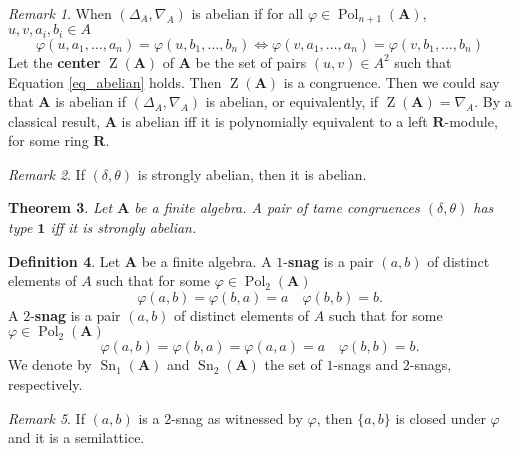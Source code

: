 \documentclass{amsart}
\theoremstyle{plain}
\newtheorem{theorem}{Theorem}[section]
\theoremstyle{definition}
\newtheorem{definition}[theorem]{Definition}
\theoremstyle{remark}
\newtheorem{remark}[theorem]{Remark}
\def\phi{\varphi}
\DeclareMathOperator{\Pol}{Pol}
\DeclareMathOperator{\Z}{Z}
\DeclareMathOperator{\Sn}{Sn}
\begin{document}
\begin{remark}
    When $(\Delta_A, \nabla_A)$ is abelian if for all $\phi \in \Pol_{n+1}(\mathbf{A})$, $u,v,a_i, b_i \in A$ 
    \begin{equation}
        \label{eq_abelian}
        \phi(u, a_1, \ldots, a_n) = \phi(u, b_1, \ldots, b_n) \iff \phi(v, a_1, \ldots, a_n) = \phi(v, b_1, \ldots, b_n)
    \end{equation}
    Let the \textbf{center} $\Z(\mathbf{A})$ of $\mathbf{A}$ be the set of pairs $(u,v) \in A^2$ such that Equation \eqref{eq_abelian} holds. 
    Then $\Z(\mathbf{A})$ is a congruence. 
    Then we could say that $\mathbf{A}$ is abelian if $(\Delta_A, \nabla_A)$ is abelian, or equivalently, if $\Z(\mathbf{A})=\nabla_A$. 
    By a classical result, $\mathbf{A}$ is abelian iff it is polynomially equivalent to a left $\mathbf{R}$-module, for some ring $\mathbf{R}$. 
\end{remark}

\begin{remark}
    If $(\delta, \theta)$ is strongly abelian, then it is abelian. 
\end{remark}

\begin{theorem}
    \label{one_iff_sa}
    Let $\mathbf{A}$ be a finite algebra. 
    A pair of tame congruences $(\delta, \theta)$ has type $\mathbf{1}$ iff it is strongly abelian. 
\end{theorem}

\begin{definition}
    Let $\mathbf{A}$ be a finite algebra. 
    A $1$-\textbf{snag} is a pair $(a,b)$ of distinct elements of $A$ such that for some $\phi \in \Pol_2(\mathbf{A})$ 
    \begin{equation*}
        \phi(a,b)=\phi(b,a)=a \quad \phi(b,b)=b \text{.}
    \end{equation*}
    A $2$-\textbf{snag} is a pair $(a,b)$ of distinct elements of $A$ such that for some $\phi \in \Pol_2(\mathbf{A})$ 
    \begin{equation*}
        \phi(a,b)=\phi(b,a)=\phi(a,a)=a \quad \phi(b,b)=b \text{.}
    \end{equation*}
    We denote by $\Sn_1(\mathbf{A})$ and $\Sn_2(\mathbf{A})$ the set of $1$-snags and $2$-snags, respectively. 
\end{definition}


\begin{remark}
    If $(a,b)$ is a $2$-snag as witnessed by $\phi$, then $\{a,b\}$ is closed under $\phi$ and it is a semilattice. 
\end{remark}
\end{document}
